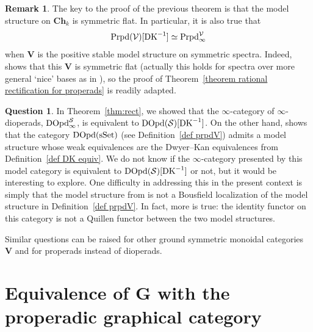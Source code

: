 \documentclass{amsart}
\numberwithin{theorem}{subsection}
\theoremstyle{definition}
\newtheorem{remark}[theorem]{Remark}
\newtheorem{question}[theorem]{Question}
\newcommand{\xsSet}{\operatorname{sSet}}
\newcommand{\xS}{\mathcal{S}}
\newcommand{\xV}{\mathcal{V}}
\newcommand{\name}[1]{\ensuremath{\text{\textup{#1}}}}
\newcommand{\bbY}{\mathbf{G}}
\newcommand{\nmproperad}{\name{Prpd}}
\begin{document}
\begin{remark}\label{remark symm spectra}
The key to the proof of the previous theorem is that the model structure on $\mathbf{Ch}_k$ is symmetric flat.
In particular, it is also true that 
\[
	\nmproperad(\xV)[\name{DK}^{-1}] \simeq \nmproperad_\infty^{\xV}
\]
when $\mathbf{V}$ is the positive stable model structure on symmetric spectra.
Indeed, \cite[Proposition 3.5.1]{PavlovScholbachSp} shows that this $\mathbf{V}$ is symmetric flat (actually this holds for spectra over more general `nice' bases as in \cite[Definition 2.3.1]{PavlovScholbachSp}), so the proof of Theorem~\ref{theorem rational rectification for properads} is readily adapted.
\end{remark}

\begin{question}
In Theorem~\ref{thm:rect}, we showed that the $\infty$-category of $\infty$-dioperads, $\name{DOpd}^\xS_\infty$, is equivalent to $\name{DOpd}(\xS)[\name{DK}^{-1}]$.
On the other hand, \cite[Theorem 5.4]{HackneyRobertsonYau:SMIP} shows that the category $\name{DOpd}(\xsSet)$ (see Definition~\ref{def prpdV}) admits a model structure whose weak equivalences are the Dwyer--Kan equivalences from Definition~\ref{def DK equiv}.
We do not know if the $\infty$-category presented by this model category is equivalent to $\name{DOpd}(\xS)[\name{DK}^{-1}]$ or not, but it would be interesting to explore.
One difficulty in addressing this in the present context is simply that the model structure from \cite[Theorem 5.4]{HackneyRobertsonYau:SMIP} is not a Bousfield localization of the model structure in Definition~\ref{def prpdV}. 
In fact, more is true: the identity functor on this category is not a Quillen functor between the two model structures.
\end{question}

Similar questions can be raised for other ground symmetric monoidal categories $\mathbf{V}$ and for properads instead of dioperads.





\appendix

\renewcommand{\thetheorem}{\thesection.\arabic{theorem}}

\section{Equivalence of \texorpdfstring{$\bbY$}{G} with the properadic graphical category}
\label{appendix comparison with HRY}
\end{document}
